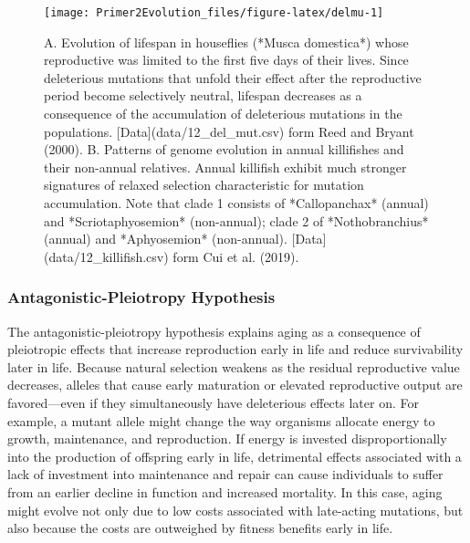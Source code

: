 \documentclass[
]{book}
\begin{document}
\begin{figure}
\texttt{[image: Primer2Evolution\_files/figure-latex/delmu-1]} \caption{A. Evolution of lifespan in houseflies (*Musca domestica*) whose reproductive was limited to the first five days of their lives. Since deleterious mutations that unfold their effect after the reproductive period become selectively neutral, lifespan decreases as a consequence of the accumulation of deleterious mutations in the populations. [Data](data/12_del_mut.csv) form Reed and Bryant (2000). B. Patterns of genome evolution in annual killifishes and their non-annual relatives. Annual killifish exhibit much stronger signatures of relaxed selection characteristic for mutation accumulation. Note that clade 1 consists of *Callopanchax* (annual) and *Scriotaphyosemion* (non-annual); clade 2 of *Nothobranchius* (annual) and *Aphyosemion* (non-annual). [Data](data/12_killifish.csv) form Cui et al. (2019).}\label{fig:delmu}
\end{figure}

\hypertarget{antagonistic-pleiotropy-hypothesis}{%
\subsubsection*{Antagonistic-Pleiotropy Hypothesis}\label{antagonistic-pleiotropy-hypothesis}}

The antagonistic-pleiotropy hypothesis explains aging as a consequence of pleiotropic effects that increase reproduction early in life and reduce survivability later in life. Because natural selection weakens as the residual reproductive value decreases, alleles that cause early maturation or elevated reproductive output are favored---even if they simultaneously have deleterious effects later on. For example, a mutant allele might change the way organisms allocate energy to growth, maintenance, and reproduction. If energy is invested disproportionally into the production of offspring early in life, detrimental effects associated with a lack of investment into maintenance and repair can cause individuals to suffer from an earlier decline in function and increased mortality. In this case, aging might evolve not only due to low costs associated with late-acting mutations, but also because the costs are outweighed by fitness benefits early in life.
\end{document}
